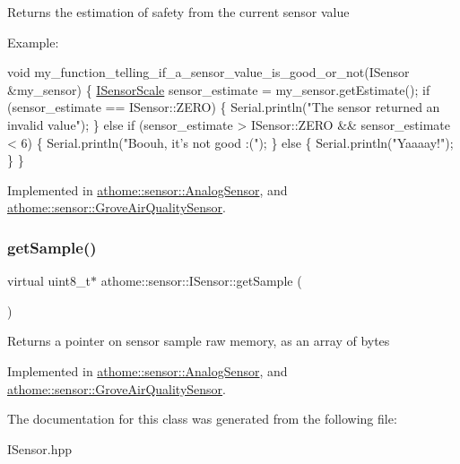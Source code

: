 Returns the estimation of safety from the current sensor value

Example\+:


\begin{DoxyCode}
\textcolor{keywordtype}{void} my\_function\_telling\_if\_a\_sensor\_value\_is\_good\_or\_not(ISensor &my\_sensor) \{
  \mbox{\hyperlink{classathome_1_1sensor_1_1_i_sensor_aa70bc27a4c17c86caf96cca776541ddf}{ISensorScale}} sensor\_estimate = my\_sensor.getEstimate();
  \textcolor{keywordflow}{if} (sensor\_estimate == ISensor::ZERO) \{
    Serial.println(\textcolor{stringliteral}{"The sensor returned an invalid value"});
  \}
  \textcolor{keywordflow}{else} \textcolor{keywordflow}{if} (sensor\_estimate > ISensor::ZERO && sensor\_estimate < 6) \{
    Serial.println(\textcolor{stringliteral}{"Boouh, it's not good :("});
  \}
  \textcolor{keywordflow}{else} \{
    Serial.println(\textcolor{stringliteral}{"Yaaaay!"});
  \}
\}
\end{DoxyCode}
 

Implemented in \mbox{\hyperlink{classathome_1_1sensor_1_1_analog_sensor_a728e2f65638f488cd1829c5f318531db}{athome\+::sensor\+::\+Analog\+Sensor}}, and \mbox{\hyperlink{classathome_1_1sensor_1_1_grove_air_quality_sensor_a3eeec77eb0bbf3932cdfa9d33a708e57}{athome\+::sensor\+::\+Grove\+Air\+Quality\+Sensor}}.

\mbox{\label{classathome_1_1sensor_1_1_i_sensor_a2513fd8acc5d8251439330ca0e78cf04}} 
\subsubsection{\texorpdfstring{get\+Sample()}{getSample()}}
{\footnotesize\ttfamily virtual uint8\+\_\+t$\ast$ athome\+::sensor\+::\+I\+Sensor\+::get\+Sample (\begin{DoxyParamCaption}{ }\end{DoxyParamCaption})\hspace{0.3cm}{\ttfamily [pure virtual]}}

Returns a pointer on sensor sample raw memory, as an array of bytes 

Implemented in \mbox{\hyperlink{classathome_1_1sensor_1_1_analog_sensor_ac45070688a9433256a5f847467c251fa}{athome\+::sensor\+::\+Analog\+Sensor}}, and \mbox{\hyperlink{classathome_1_1sensor_1_1_grove_air_quality_sensor_aee12d8cf6439b752c868f75cae298182}{athome\+::sensor\+::\+Grove\+Air\+Quality\+Sensor}}.



The documentation for this class was generated from the following file\+:\begin{DoxyCompactItemize}
\item 
I\+Sensor.\+hpp\end{DoxyCompactItemize}
